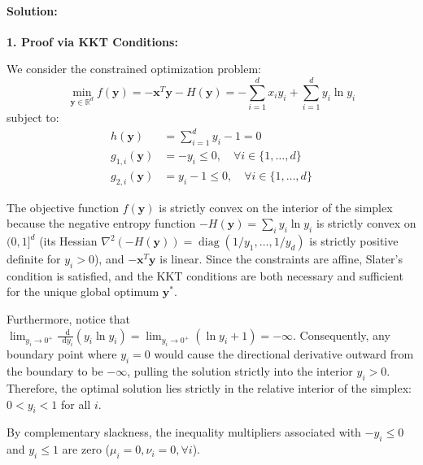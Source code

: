 \documentclass[11pt,english]{article}
\newcommand{\diff}{\mathop{}\!\mathrm{d}}
\begin{document}
\begin{enumerate}
\paragraph{Solution:}

\textbf{1. Proof via KKT Conditions:}

We consider the constrained optimization problem:
\begin{equation}
    \min_{\mathbf{y} \in \mathbb{R}^d} f(\mathbf{y}) = -\mathbf{x}^T \mathbf{y} - H(\mathbf{y}) = -\sum_{i=1}^d x_i y_i + \sum_{i=1}^d y_i \ln y_i
\end{equation}
subject to:
\begin{align}
    h(\mathbf{y}) &= \sum_{i=1}^d y_i - 1 = 0 \\
    g_{1, i}(\mathbf{y}) &= -y_i \le 0, \quad \forall i \in \{1, \dots, d\} \\
    g_{2, i}(\mathbf{y}) &= y_i - 1 \le 0, \quad \forall i \in \{1, \dots, d\}
\end{align}

The objective function $f(\mathbf{y})$ is strictly convex on the interior of the simplex because the negative entropy function $-H(\mathbf{y}) = \sum_i y_i \ln y_i$ is strictly convex on $(0, 1]^d$ (its Hessian $\nabla^2 (-H(\mathbf{y})) = \operatorname{diag}(1/y_1, \dots, 1/y_d)$ is strictly positive definite for $y_i > 0$), and $-\mathbf{x}^T \mathbf{y}$ is linear. Since the constraints are affine, Slater's condition is satisfied, and the KKT conditions are both necessary and sufficient for the unique global optimum $\mathbf{y}^*$.

Furthermore, notice that $\lim_{y_i \to 0^+} \frac{\diff}{\diff y_i}(y_i \ln y_i) = \lim_{y_i \to 0^+} (\ln y_i + 1) = -\infty$. Consequently, any boundary point where $y_i = 0$ would cause the directional derivative outward from the boundary to be $-\infty$, pulling the solution strictly into the interior $y_i > 0$. Therefore, the optimal solution lies strictly in the relative interior of the simplex: $0 < y_i < 1$ for all $i$.

By complementary slackness, the inequality multipliers associated with $-y_i \le 0$ and $y_i \le 1$ are zero ($\mu_i = 0, \nu_i = 0, \forall i$).


\end{enumerate}
\end{document}
